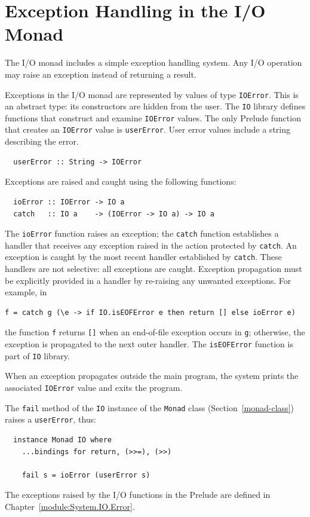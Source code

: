 \section{Exception Handling in the I/O Monad}
\label{io-exceptions}

The I/O monad includes a simple exception handling system.  Any I/O
operation may raise an exception instead of returning a result.

Exceptions in the I/O monad are represented by values of 
type \mbox{\tt IOError}.  This is an abstract type: its constructors are hidden
from the user.  The \mbox{\tt IO} library defines functions that construct and
examine \mbox{\tt IOError} values.  The only Prelude function that creates an
\mbox{\tt IOError} value is \mbox{\tt userError}.  User error values include a string
describing the error.
\bprog
{\small\begin{verbatim}
  userError :: String -> IOError
\end{verbatim}}
\eprog
{}%
Exceptions are raised and caught using the following functions:
\bprog
{\small\begin{verbatim}
  ioError :: IOError -> IO a
  catch   :: IO a    -> (IOError -> IO a) -> IO a 
\end{verbatim}}
\eprog
{}%
%
The \mbox{\tt ioError} function raises an exception;
the \mbox{\tt catch} function establishes a handler that receives any
exception raised in the action protected by \mbox{\tt catch}.  An exception is
caught by the most recent handler established by \mbox{\tt catch}.  These
handlers are not selective: all exceptions are caught.  Exception
propagation must be explicitly provided in a handler by re-raising any
unwanted exceptions.  For example, in
\bprog
{\small\begin{verbatim}
f = catch g (\e -> if IO.isEOFError e then return [] else ioError e)
\end{verbatim}}
\eprog
the function \mbox{\tt f} returns \mbox{\tt []} when an end-of-file exception occurs
in \mbox{\tt g}; otherwise, the exception is propagated to the next
outer handler.  The \mbox{\tt isEOFError} function is part of \mbox{\tt IO} library.

When an exception propagates outside the main program, the \Haskell{}
system prints the associated \mbox{\tt IOError} value and exits the program.

The \mbox{\tt fail} method of the \mbox{\tt IO} instance of the \mbox{\tt Monad} class (Section~\ref{monad-class}) raises a
\mbox{\tt userError}, thus:
\bprog
{\small\begin{verbatim}
  instance Monad IO where 
    ...bindings for return, (>>=), (>>)

    fail s = ioError (userError s)
\end{verbatim}}
\eprog
{}%
The exceptions raised by the I/O functions in the Prelude are defined
in Chapter~\ref{module:System.IO.Error}.





